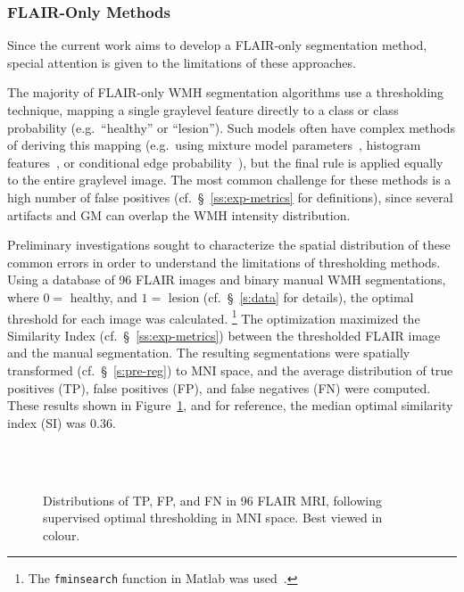 \subsubsection{FLAIR-Only Methods}\label{sss:limits-flair}
Since the current work aims to develop a FLAIR-only segmentation method,
special attention is given to the limitations of these approaches.
\par
The majority of FLAIR-only WMH segmentation algorithms use a thresholding technique,
mapping a single graylevel feature directly to a class or class probability
(e.g.\ ``healthy'' or ``lesion'').
Such models often have complex methods of deriving this mapping (e.g.\ 
using mixture model parameters~\cite{Roura2015},
histogram features~\cite{Yoo2014},
or conditional edge probability~\cite{Knight2016}),
but the final rule is applied equally to the entire graylevel image.
The most common challenge for these methods is a high number of false positives
(cf.~\S~\ref{ss:exp-metrics} for definitions),
since several artifacts and GM can overlap the WMH intensity distribution.
\par
Preliminary investigations sought to characterize the spatial distribution of these common errors
in order to understand the limitations of thresholding methods.
Using a database of 96 FLAIR images and binary manual WMH segmentations,
where $0 =$ healthy, and $1 =$ lesion
(cf.~\S~\ref{s:data} for details),
the optimal threshold for each image was calculated.%
\footnote{The \texttt{fminsearch} function in Matlab was used~\cite{Lagarias1998}.}
The optimization maximized the Similarity Index (cf.~\S~\ref{ss:exp-metrics})
between the thresholded FLAIR image and the manual segmentation.
The resulting segmentations were spatially transformed (cf.~\S~\ref{s:pre-reg})
to MNI space, and the average distribution of
true positives (TP), false positives (FP), and false negatives (FN)
were computed.
These results shown in Figure~\ref{fig:tpfpfn-thropt},
and for reference, the median optimal similarity index (SI) was 0.36.
\begin{figure}
  \centering
  \\[0.5em]
  \\[0.5em]
  \caption{Distributions of TP, FP, and FN in 96 FLAIR MRI,
    following supervised optimal thresholding in MNI space.
    Best viewed in colour.}%
  \label{fig:tpfpfn-thropt}
\end{figure}
